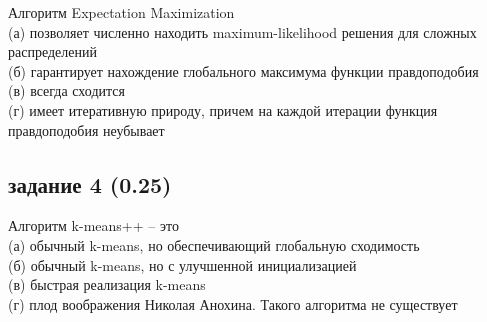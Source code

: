 \documentclass[10pt,a4paper]{article}
\begin{document}
Алгоритм Expectation Maximization \\
(а) позволяет численно находить maximum-likelihood решения для сложных распределений \\
(б) гарантирует нахождение глобального максимума функции правдоподобия \\
(в) всегда сходится \\
(г) имеет итеративную природу, причем на каждой итерации функция правдоподобия неубывает

\subsection*{задание 4 (0.25)}

Алгоритм k-means++ -- это \\
(а) обычный k-means, но обеспечивающий глобальную сходимость \\
(б) обычный k-means, но с улучшенной инициализацией \\
(в) быстрая реализация k-means \\
(г) плод воображения Николая Анохина. Такого алгоритма не существует \\
\end{document}
